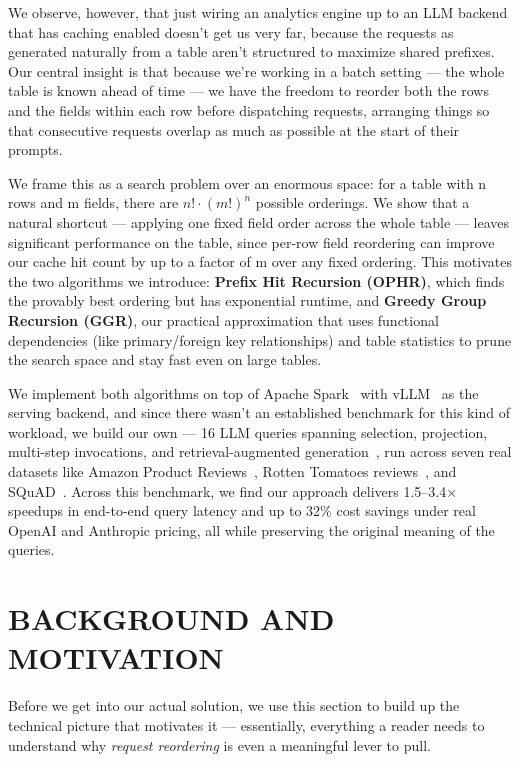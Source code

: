 \documentclass[manuscript,review]{acmart}
\begin{document}
We observe, however, that just wiring an analytics engine up to an LLM backend that has caching enabled doesn't get us very far, because the requests as generated naturally from a table aren't structured to maximize shared prefixes. Our central insight is that because we're working in a batch setting — the whole table is known ahead of time — we have the freedom to reorder both the rows and the fields within each row before dispatching requests, arranging things so that consecutive requests overlap as much as possible at the start of their prompts.

We frame this as a search problem over an enormous space: for a table with n rows and m fields, there are $n!·(m!)^{n}$ possible orderings. We show that a natural shortcut — applying one fixed field order across the whole table — leaves significant performance on the table, since per-row field reordering can improve our cache hit count by up to a factor of m over any fixed ordering. This motivates the two algorithms we introduce: \textbf{ Prefix Hit Recursion (OPHR)}, which finds the provably best ordering but has exponential runtime, and \textbf{ Greedy Group Recursion (GGR)}, our practical approximation that uses functional dependencies (like primary/foreign key relationships) and table statistics to prune the search space and stay fast even on large tables.

We implement both algorithms on top of Apache Spark~\cite{zaharia2012rdd} with vLLM~\cite{kwon2023vllm} as the serving backend, and since there wasn't an established benchmark for this kind of workload, we build our own — 16 LLM queries spanning selection, projection, multi-step invocations, and retrieval-augmented generation~\cite{lewis2021rag}, run across seven real datasets like Amazon Product Reviews~\cite{he2016ups}, Rotten Tomatoes reviews~\cite{pang2005stars}, and SQuAD~\cite{rajpurkar2016squad}. Across this benchmark, we find our approach delivers 1.5–3.4× speedups in end-to-end query latency and up to 32\% cost savings under real OpenAI and Anthropic pricing, all while preserving the original meaning of the queries.
\section{BACKGROUND AND MOTIVATION}
Before we get into our actual solution, we use this section to build up the technical picture that motivates it — essentially, everything a reader needs to understand why \textit{request reordering} is even a meaningful lever to pull.
\end{document}
